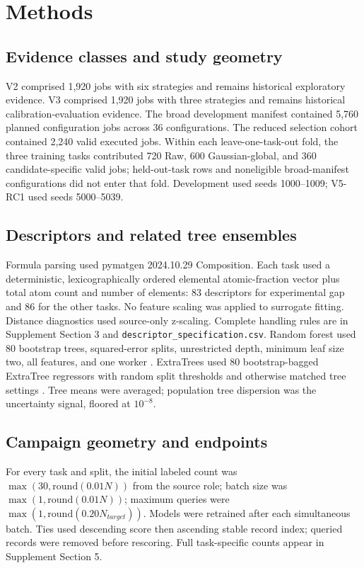 \documentclass[10pt]{article}
\begin{document}
\section{Methods}
\subsection{Evidence classes and study geometry}
V2 comprised 1,920 jobs with six strategies and remains historical exploratory evidence. V3 comprised 1,920 jobs with three strategies and remains historical calibration-evaluation evidence. The broad development manifest contained 5,760 planned configuration jobs across 36 configurations. The reduced selection cohort contained 2,240 valid executed jobs. Within each leave-one-task-out fold, the three training tasks contributed 720 Raw, 600 Gaussian-global, and 360 candidate-specific valid jobs; held-out-task rows and noneligible broad-manifest configurations did not enter that fold. Development used seeds 1000--1009; V5-RC1 used seeds 5000--5039.

\subsection{Descriptors and related tree ensembles}
Formula parsing used pymatgen 2024.10.29 Composition. Each task used a deterministic, lexicographically ordered elemental atomic-fraction vector plus total atom count and number of elements: 83 descriptors for experimental gap and 86 for the other tasks. No feature scaling was applied to surrogate fitting. Distance diagnostics used source-only z-scaling. Complete handling rules are in Supplement Section 3 and \texttt{descriptor\_specification.csv}. Random forest used 80 bootstrap trees, squared-error splits, unrestricted depth, minimum leaf size two, all features, and one worker \citep{breiman2001rf,meinshausen2006qrf,wager2014confidence,mentch2016uncertainty}. ExtraTrees used 80 bootstrap-bagged ExtraTree regressors with random split thresholds and otherwise matched tree settings \citep{geurts2006extratrees}. Tree means were averaged; population tree dispersion was the uncertainty signal, floored at $10^{-8}$.

\subsection{Campaign geometry and endpoints}
For every task and split, the initial labeled count was $\max(30,\mathrm{round}(0.01N))$ from the source role; batch size was $\max(1,\mathrm{round}(0.01N))$; maximum queries were $\max(1,\mathrm{round}(0.20N_{target}))$. Models were retrained after each simultaneous batch. Ties used descending score then ascending stable record index; queried records were removed before rescoring. Full task-specific counts appear in Supplement Section 5.
\end{document}
